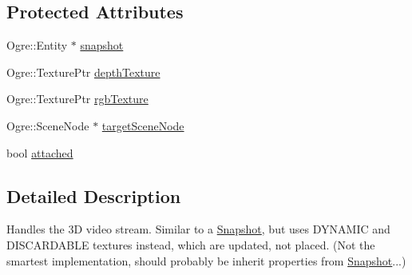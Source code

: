 \subsection*{\-Protected \-Attributes}
\begin{DoxyCompactItemize}
\item 
\-Ogre\-::\-Entity $\ast$ \hyperlink{classVideo3D_ab8d19ec21e20d8e4fcb921db1f05c96e}{snapshot}
\item 
\-Ogre\-::\-Texture\-Ptr \hyperlink{classVideo3D_a1e9d633a5ac0c2b2468611190c2bba12}{depth\-Texture}
\item 
\-Ogre\-::\-Texture\-Ptr \hyperlink{classVideo3D_ae6ddba8b94b5f01dc4761255fcffdf81}{rgb\-Texture}
\item 
\-Ogre\-::\-Scene\-Node $\ast$ \hyperlink{classVideo3D_ab3e0e29264b1e813c3075bc0d562a2e8}{target\-Scene\-Node}
\item 
bool \hyperlink{classVideo3D_a4dc5c42b3005ccf0e6e9cffd26a6351d}{attached}
\end{DoxyCompactItemize}


\subsection{\-Detailed \-Description}
\-Handles the 3\-D video stream. \-Similar to a \hyperlink{classSnapshot}{\-Snapshot}, but uses \-D\-Y\-N\-A\-M\-I\-C and \-D\-I\-S\-C\-A\-R\-D\-A\-B\-L\-E textures instead, which are updated, not placed. (\-Not the smartest implementation, should probably be inherit properties from \hyperlink{classSnapshot}{\-Snapshot}...) 

